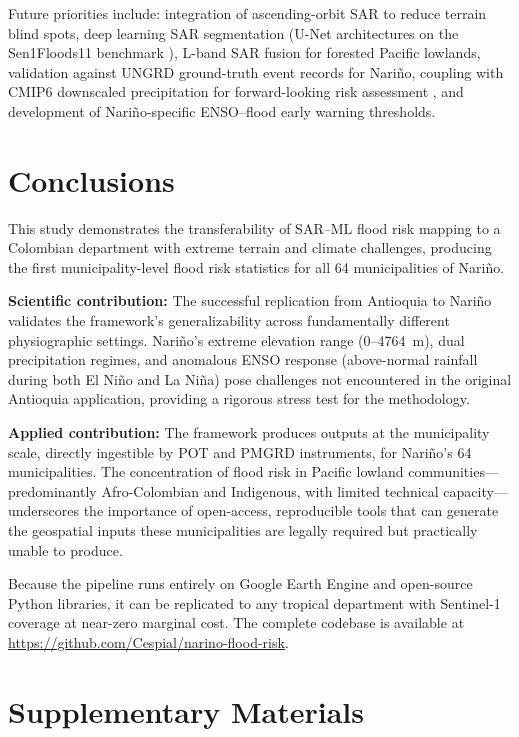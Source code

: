 \documentclass{article}
\begin{document}
Future priorities include: integration of ascending-orbit SAR to reduce terrain blind spots, deep learning SAR segmentation (U-Net architectures on the Sen1Floods11 benchmark \citep{Bonafilia2020}), L-band SAR fusion for forested Pacific lowlands, validation against UNGRD ground-truth event records for Nari\~no, coupling with CMIP6 downscaled precipitation for forward-looking risk assessment \citep{Arias2023, RiverosGarzon2025}, and development of Nari\~no-specific ENSO--flood early warning thresholds.

\section{Conclusions}
\label{sec:conclusions}

This study demonstrates the transferability of SAR--ML flood risk mapping to a Colombian department with extreme terrain and climate challenges, producing the first municipality-level flood risk statistics for all 64 municipalities of Nari\~no.

\textbf{Scientific contribution:} The successful replication from Antioquia to Nari\~no validates the framework's generalizability across fundamentally different physiographic settings. Nari\~no's extreme elevation range (0--\SI{4764}{\metre}), dual precipitation regimes, and anomalous ENSO response (above-normal rainfall during both El Ni\~no and La Ni\~na) pose challenges not encountered in the original Antioquia application, providing a rigorous stress test for the methodology.

\textbf{Applied contribution:} The framework produces outputs at the municipality scale, directly ingestible by POT and PMGRD instruments, for Nari\~no's 64 municipalities. The concentration of flood risk in Pacific lowland communities---predominantly Afro-Colombian and Indigenous, with limited technical capacity---underscores the importance of open-access, reproducible tools that can generate the geospatial inputs these municipalities are legally required but practically unable to produce.

Because the pipeline runs entirely on Google Earth Engine and open-source Python libraries, it can be replicated to any tropical department with Sentinel-1 coverage at near-zero marginal cost. The complete codebase is available at \url{https://github.com/Cespial/narino-flood-risk}.

\section*{Supplementary Materials}
\end{document}
